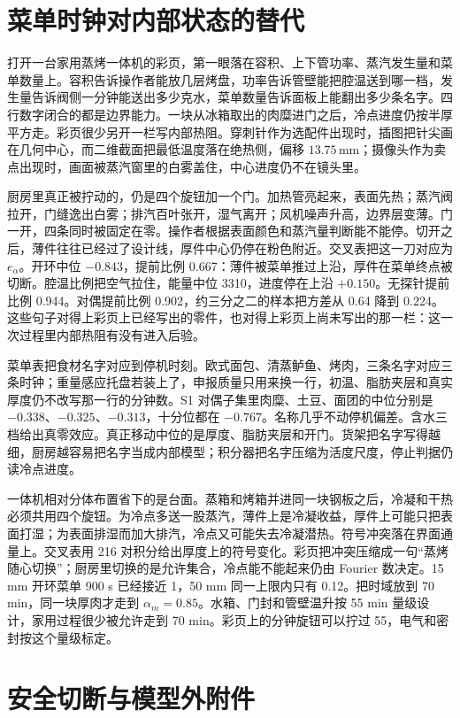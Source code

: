 \section{菜单时钟对内部状态的替代}

打开一台家用蒸烤一体机的彩页，第一眼落在容积、上下管功率、蒸汽发生量和菜单数量上。容积告诉操作者能放几层烤盘，功率告诉管壁能把腔温送到哪一档，发生量告诉阀侧一分钟能送出多少克水，菜单数量告诉面板上能翻出多少条名字。四行数字闭合的都是边界能力。一块从冰箱取出的肉糜进门之后，冷点进度仍按半厚平方走。彩页很少另开一栏写内部热阻。穿刺针作为选配件出现时，插图把针尖画在几何中心，而二维截面把最低温度落在绝热侧，偏移 \(13.75\,\mathrm{mm}\)；摄像头作为卖点出现时，画面被蒸汽窗里的白雾盖住，中心进度仍不在镜头里。

厨房里真正被拧动的，仍是四个旋钮加一个门。加热管亮起来，表面先热；蒸汽阀拉开，门缝逸出白雾；排汽百叶张开，湿气离开；风机噪声升高，边界层变薄。门一开，四条同时被固定在零。操作者根据表面颜色和蒸汽量判断能不能停。切开之后，薄件往往已经过了设计线，厚件中心仍停在粉色附近。交叉表把这一刀对应为 \(e_{\alpha}\)。开环中位 \(-0.843\)，提前比例 0.667：薄件被菜单推过上沿，厚件在菜单终点被切断。腔温比例把空气拉住，能量中位 3310，进度停在上沿 \(+0.150\)。无探针提前比例 0.944。对偶提前比例 0.902，约三分之二的样本把方差从 0.64 降到 0.224。这些句子对得上彩页上已经写出的零件，也对得上彩页上尚未写出的那一栏：这一次过程里内部热阻有没有进入后验。

菜单表把食材名字对应到停机时刻。欧式面包、清蒸鲈鱼、烤肉，三条名字对应三条时钟；重量感应托盘若装上了，申报质量只用来换一行，初温、脂肪夹层和真实厚度仍不改写那一行的分钟数。S1 对偶子集里肉糜、土豆、面团的中位分别是 \(-0.338\)、\(-0.325\)、\(-0.313\)，十分位都在 \(-0.767\)。名称几乎不动停机偏差。含水三档给出真零效应。真正移动中位的是厚度、脂肪夹层和开门。货架把名字写得越细，厨房越容易把名字当成内部模型；积分器把名字压缩为活度尺度，停止判据仍读冷点进度。

一体机相对分体布置省下的是台面。蒸箱和烤箱并进同一块钢板之后，冷凝和干热必须共用四个旋钮。为冷点多送一股蒸汽，薄件上是冷凝收益，厚件上可能只把表面打湿；为表面排湿而加大排汽，冷点又可能失去冷凝潜热。符号冲突落在界面通量上。交叉表用 216 对积分给出厚度上的符号变化。彩页把冲突压缩成一句“蒸烤随心切换”；厨房里切换的是允许集合，冷点能不能起来仍由 Fourier 数决定。15 mm 开环菜单 900 s 已经接近 1，50 mm 同一上限内只有 0.12。把时域放到 70 min，同一块厚肉才走到 \(\alpha_m=0.85\)。水箱、门封和管壁温升按 55 min 量级设计，家用过程很少被允许走到 70 min。彩页上的分钟旋钮可以拧过 55，电气和密封按这个量级标定。

\section{安全切断与模型外附件}

